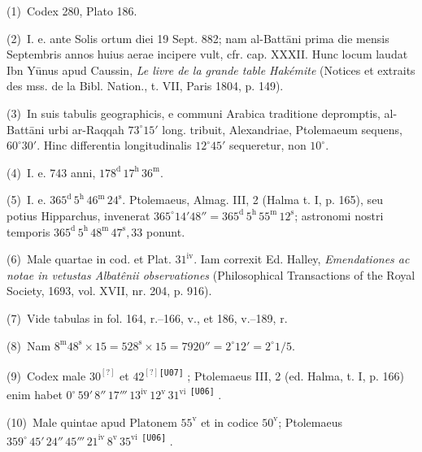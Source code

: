 \documentclass[10pt,a4paper]{article}
\newcommand{\A}[1]{\hypertarget{#1}{}}
\newcommand{\NN}[2]{%
  \par\noindent\textup{(#1)}\ #2%
}
\newcommand{\U}[2]{%
  #2\textsuperscript{\texttt{[#1]}}%
}
\newcommand{\SX}[7]{%
  \ensuremath{%
    #1^\circ\,#2'\,#3''\,#4'''\,%
    #5^{\mathrm{iv}}\,#6^{\mathrm{v}}\,#7^{\mathrm{vi}}%
  }%
}
\begin{document}
\begin{multicols}{2}
\footnotesize

\A{AB01-PDF0131-N01}
\NN{1}{Codex 280, Plato 186.}

\A{AB01-PDF0131-N02}
\NN{2}{I. e. ante Solis ortum diei 19 Sept. 882; nam al-Battāni
prima die mensis Septembris annos huius aerae incipere vult,
cfr. cap. XXXII. Hunc locum laudat Ibn Yūnus apud Caussin,
\textit{Le livre de la grande table Hakémite}
(Notices et extraits des mss. de la Bibl. Nation., t. VII,
Paris 1804, p. 149).}

\A{AB01-PDF0131-N03}
\NN{3}{In suis tabulis geographicis, e communi Arabica traditione
depromptis, al-Battāni urbi ar-Raqqah $73^\circ15'$ long. tribuit,
Alexandriae, Ptolemaeum sequens, $60^\circ30'$. Hinc differentia
longitudinalis $12^\circ45'$ sequeretur, non $10^\circ$.}

\A{AB01-PDF0131-N04}
\NN{4}{I. e. 743 anni,
$178^{\mathrm d}\,17^{\mathrm h}\,36^{\mathrm m}$.}

\A{AB01-PDF0131-N05}
\NN{5}{I. e.
$365^{\mathrm d}\,5^{\mathrm h}\,46^{\mathrm m}\,24^{\mathrm s}$.
Ptolemaeus, Almag. III, 2 (Halma t. I, p. 165), seu potius
Hipparchus, invenerat
$365^\circ14'48''=
365^{\mathrm d}\,5^{\mathrm h}\,55^{\mathrm m}\,12^{\mathrm s}$;
astronomi nostri temporis
$365^{\mathrm d}\,5^{\mathrm h}\,48^{\mathrm m}\,47^{\mathrm s}{,}33$
ponunt.}

\A{AB01-PDF0131-N06}
\NN{6}{Male quartae in cod. et Plat. $31^{\mathrm{iv}}$.
Iam correxit Ed. Halley,
\textit{Emendationes ac notae in vetustas Albatênii observationes}
(Philosophical Transactions of the Royal Society, 1693,
vol. XVII, nr. 204, p. 916).}

\A{AB01-PDF0131-N07}
\NN{7}{Vide tabulas in fol. 164, r.--166, v.,
et 186, v.--189, r.}

\A{AB01-PDF0131-N08}
\NN{8}{Nam
$8^{\mathrm m}48^{\mathrm s}\times15
=528^{\mathrm s}\times15
=7920''
=2^\circ12'
=2^\circ1/5$.}

\A{AB01-PDF0131-N09}
\NN{9}{Codex male \U{U07}{$30^{[?]}$ et $42^{[?]}$};
Ptolemaeus III, 2 (ed. Halma, t. I, p. 166) enim habet
\U{U06}{\SX{0}{59}{8}{17}{13}{12}{31}}.}

\A{AB01-PDF0131-N10}
\NN{10}{Male quintae apud Platonem $55^{\mathrm v}$ et in codice
$50^{\mathrm v}$; Ptolemaeus
\U{U06}{\SX{359}{45}{24}{45}{21}{8}{35}}.}

\end{multicols}

\end{document}
